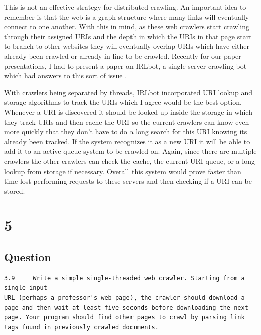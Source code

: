 \documentclass[letterpaper,11pt]{article}
\begin{document}
This is not an effective strategy for distributed crawling. 
An important idea to remember is that the web is a graph structure where many links will eventually connect to one another.
With this in mind, as these web crawlers start crawling through their assigned URIs and the depth in which the URIs in that page start to branch to other websites they will eventually overlap URIs which have either already been crawled or already in line to be crawled.
Recently for our paper presentations, I had to present a paper on IRLbot, a single server crawling bot which had answers to this sort of issue \cite{irlbot}.

With crawlers being separated by threads, IRLbot incorporated URI lookup and storage algorithms to track the URIs which I agree would be the best option. 
Whenever a URI is discovered it should be looked up inside the storage in which they track URIs and then cache the URI so the current crawlers can know even more quickly that they don't have to do a long search for this URI knowing its already been tracked.
If the system recognizes it as a new URI it will be able to add it to an active queue system to be crawled on. 
Again, since there are multiple crawlers the other crawlers can check the cache, the current URI queue, or a long lookup from storage if necessary.
Overall this system would prove faster than time lost performing requests to these servers and then checking if a URI can be stored.


\clearpage


\section*{5}

\subsection*{Question}

\begin{verbatim}
3.9 	Write a simple single-threaded web crawler. Starting from a single input 
URL (perhaps a professor's web page), the crawler should download a 
page and then wait at least five seconds before downloading the next 
page. Your program should find other pages to crawl by parsing link 
tags found in previously crawled documents.
\end{verbatim}
\end{document}
